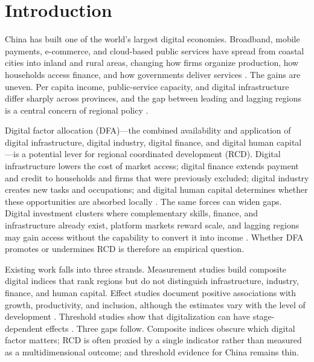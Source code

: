 \section{Introduction}\label{sec:intro}

China has built one of the world's largest digital economies. Broadband, mobile payments, e-commerce, and cloud-based public services have spread from coastal cities into inland and rural areas, changing how firms organize production, how households access finance, and how governments deliver services \citep{goldfarb2019}. The gains are uneven. Per capita income, public-service capacity, and digital infrastructure differ sharply across provinces, and the gap between leading and lagging regions is a central concern of regional policy \citep{kanbur2005,worldbank2009}.

Digital factor allocation (DFA)---the combined availability and application of digital infrastructure, digital industry, digital finance, and digital human capital---is a potential lever for regional coordinated development (RCD). Digital infrastructure lowers the cost of market access; digital finance extends payment and credit to households and firms that were previously excluded; digital industry creates new tasks and occupations; and digital human capital determines whether these opportunities are absorbed locally \citep{czernich2011,hjort2019,jack2014,liu2023}. The same forces can widen gaps. Digital investment clusters where complementary skills, finance, and infrastructure already exist, platform markets reward scale, and lagging regions may gain access without the capability to convert it into income \citep{forman2012,akerman2015,acemoglu2020,vandijk2005}. Whether DFA promotes or undermines RCD is therefore an empirical question.

Existing work falls into three strands. Measurement studies build composite digital indices \citep{pku2021,chen2025} that rank regions but do not distinguish infrastructure, industry, finance, and human capital. Effect studies document positive associations with growth, productivity, and inclusion, although the estimates vary with the level of development \citep{czernich2011,hjort2019,akerman2015,liu2023}. Threshold studies show that digitalization can have stage-dependent effects \citep{qi2025}. Three gaps follow. Composite indices obscure which digital factor matters; RCD is often proxied by a single indicator rather than measured as a multidimensional outcome; and threshold evidence for China remains thin.

